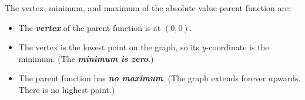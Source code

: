 \begin{myConcept}{The vertex, minimum, and maximum of the absolute value parent function are:}
    \begin{itemize}
        \item The {\bfseries\itshape vertex}  of the parent function is at $(0,0)$.
        \item The vertex is the lowest point on the graph, so its $y$-coordinate is the minimum.  (The {\bfseries\itshape minimum is zero}.)
        \item The parent function has {\bfseries\itshape no maximum}. (The graph extends forever upwards. There is no highest point.)    
    \end{itemize}
\end{myConcept}

